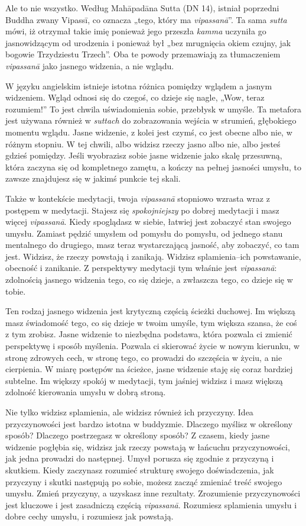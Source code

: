 \documentclass[12pt,openany]{book}
\begin{document}
Ale to nie wszystko. Według Mahāpadāna Sutta (DN 14), istniał poprzedni Buddha zwany Vipassī, co oznacza „tego, który ma \textit{vipassanā}”. Ta sama \textit{sutta} mówi, iż otrzymał takie imię ponieważ jego przeszła  \textit{kamma} uczyniła go jasnowidzącym od urodzenia i ponieważ był „bez mrugnięcia okiem czujny, jak bogowie Trzydziestu Trzech”. Oba te powody przemawiają za tłumaczeniem  \textit{vipassanā} jako jasnego widzenia, a nie wglądu.

W języku angielskim istnieje istotna różnica pomiędzy wglądem a jasnym widzeniem. Wgląd odnosi się do czegoś, co dzieje się nagle, „Wow, teraz rozumiem!” To jest chwila uświadomienia sobie, przebłysk w umyśle. Ta metafora jest używana również w \textit{suttach} do zobrazowania wejścia w strumień, głębokiego momentu wglądu. Jasne widzenie, z kolei jest czymś, co jest obecne albo nie, w różnym stopniu. W tej chwili, albo widzisz rzeczy jasno albo nie, albo jesteś gdzieś pomiędzy. Jeśli wyobrazisz sobie jasne widzenie jako skalę przesuwną, która zaczyna się od kompletnego zamętu, a kończy na pełnej jasności umysłu, to zawsze znajdujesz się w jakimś punkcie tej skali.

Także w kontekście medytacji, twoja \textit{vipassanā} stopniowo wzrasta wraz z postępem w medytacji. Stajesz się \textit{spokojniejszy} po dobrej medytacji i masz więcej \textit{vipassanā}. Kiedy spoglądasz w siebie, łatwiej jest zobaczyć stan swojego umysłu. Zamiast pędzić umysłem od pomysłu do pomysłu, od jednego stanu mentalnego do drugiego, masz teraz wystarczającą jasność, aby zobaczyć, co tam jest. Widzisz, że rzeczy powstają i zanikają. Widzisz splamienia–ich powstawanie, obecność i zanikanie. Z perspektywy medytacji tym właśnie jest \textit{vipassanā}: zdolnością jasnego widzenia tego, co się dzieje, a zwłaszcza tego, co dzieje się w tobie.

Ten rodzaj jasnego widzenia jest krytyczną częścią ścieżki duchowej. Im większą masz świadomość tego, co się dzieje w twoim umyśle, tym większa szansa, że coś z tym zrobisz. Jasne widzenie to niezbędna podstawa, która pozwala ci zmienić perspektywę i sposób myślenia. Pozwala ci skierować życie w nowym kierunku, w stronę zdrowych cech, w stronę tego, co prowadzi do szczęścia w życiu, a nie cierpienia. W miarę postępów na ścieżce, jasne widzenie staję się coraz bardziej subtelne. Im większy spokój w medytacji, tym jaśniej widzisz i masz większą zdolność kierowania umysłu w dobrą stroną.

Nie tylko widzisz splamienia, ale widzisz również ich przyczyny. Idea przyczynowości jest bardzo istotna w buddyzmie. Dlaczego myślisz w określony sposób? Dlaczego postrzegasz w określony sposób? Z czasem, kiedy jasne widzenie pogłębia się, widzisz jak rzeczy powstają w łańcuchu przyczynowości, jak jedna prowadzi do następnej. Umysł porusza się zgodnie z przyczyną i skutkiem. Kiedy zaczynasz rozumieć strukturę swojego doświadczenia, jak przyczyny i skutki następują po sobie, możesz zacząć zmieniać treść swojego umysłu. Zmień przyczyny, a uzyskasz inne rezultaty. Zrozumienie przyczynowości jest kluczowe i jest zasadniczą częścią \textit{vipassanā}. Rozumiesz splamienia umysłu i dobre cechy umysłu, i rozumiesz jak powstają.
\end{document}
